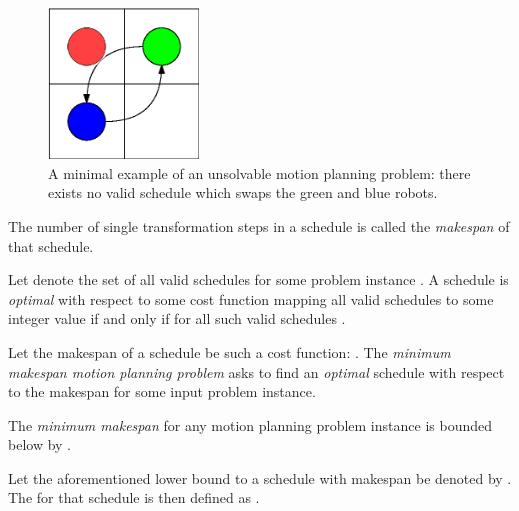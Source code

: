 \begin{figure}[h]
	\centering
	\includegraphics[width=4cm]{include/impossible_2x2.eps}
	\caption{A minimal example of an unsolvable motion planning problem: there exists no valid schedule which swaps the green and blue robots.}\label{fig:reachability}
\end{figure}

\begin{definition}\label{def:makespan}
	The number of single transformation steps in a schedule is called the \emph{makespan} of that schedule.
\end{definition}

\begin{definition}\label{def:optimality}
	Let \ilmath{\schedules} denote the set of all valid schedules for some problem instance . 
	A schedule  is \emph{optimal} with respect to some cost function  mapping all valid schedules to some integer value if and only if  for all such valid schedules  \fda{\(\in \schedules\)}.
\end{definition}

\begin{definition}\label{def:m3pp}
	Let the makespan of a schedule be such a cost function: . 
	The \emph{minimum makespan motion planning problem} asks to find an \emph{optimal} schedule with respect to the makespan  for some input problem instance.
\end{definition}

\begin{remark}
	The \emph{minimum makespan} for any motion planning problem instance  is bounded below by .
\end{remark}

\begin{definition}
	Let the aforementioned lower bound to a schedule with makespan  be denoted by . 
	The  for that schedule is then defined as  .
\end{definition}

